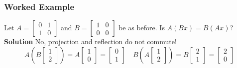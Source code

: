 \subsubsection{Worked Example}
Let $A = \begin{bmatrix}
  0 & 1 \\
  1 & 0
\end{bmatrix}$ and $B = \begin{bmatrix}
  1 & 0 \\
  0 & 0
\end{bmatrix}$ be as before. Is $A(Bx) = B(Ax)$?
\\[8pt]
\textbf{Solution}
No, projection and reflection do not commute!
\[
  A(B\begin{bmatrix}
    1 \\ 2
  \end{bmatrix}) = A \begin{bmatrix}
    1 \\ 0
  \end{bmatrix} = \begin{bmatrix}
    0 \\ 1
  \end{bmatrix} \quad
  B(A\begin{bmatrix}
    1 \\ 2
  \end{bmatrix}) = B \begin{bmatrix}
    2 \\ 1
  \end{bmatrix} = \begin{bmatrix}
    2 \\ 0
  \end{bmatrix}
\]

